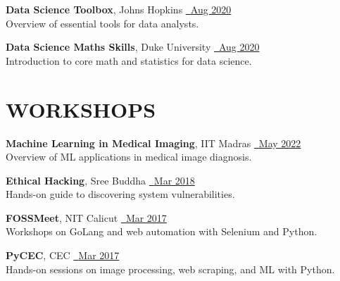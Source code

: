 \documentclass[11pt,a4paper]{article}
\begin{document}
\textbf{Data Science Toolbox}, Johns Hopkins \hfill
\href{https://coursera.org/share/bd0023b71386ae9c7246bad3d5b566a7}{\faFilePdfO~\textcolor{linkgray}{Aug 2020}}\\
Overview of essential tools for data analysts.

\textbf{Data Science Maths Skills}, Duke University \hfill
\href{https://coursera.org/share/4bcf67532cd1ae69781e51db0bbb3445}{\faFilePdfO~\textcolor{linkgray}{Aug 2020}}\\
Introduction to core math and statistics for data science.

\section*{WORKSHOPS}
\textbf{Machine Learning in Medical Imaging}, IIT Madras \hfill
\href{https://jishnujp.github.io/certificates/mlmedic.jpg}{\faFilePdfO~\textcolor{linkgray}{May 2022}} \\
Overview of ML applications in medical image diagnosis.

\textbf{Ethical Hacking}, Sree Buddha \hfill
\href{https://jishnujp.github.io/certificates/ethical_hacking.jpg}{\faFilePdfO~\textcolor{linkgray}{Mar 2018}} \\
Hands-on guide to discovering system vulnerabilities.

\textbf{FOSSMeet}, NIT Calicut \hfill
\href{https://jishnujp.github.io/certificates/fossmeet.jpg}{\faFilePdfO~\textcolor{linkgray}{Mar 2017}} \\
Workshops on GoLang and web automation with Selenium and Python.

\textbf{PyCEC}, CEC \hfill
\href{https://jishnujp.github.io/certificates/pycec.jpg}{\faFilePdfO~\textcolor{linkgray}{Mar 2017}} \\
Hands-on sessions on image processing, web scraping, and ML with Python.
\end{document}
